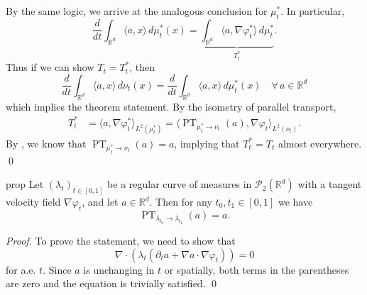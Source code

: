 \documentclass[11pt]{article}
\newcommand{\PT}{\operatorname{PT}}
\begin{document}
By the same logic, we arrive at the analogous conclusion for $\mu_t^*$. In particular, 
\[\frac{d}{dt}\int_{\mathbb{R}^d} \langle a, x\rangle \, d\mu_t^*(x) = \underbrace{\int_{\mathbb{R}^d} \langle a, \nabla \varphi_t^*\rangle \, d\mu_t^*}_{T^*_t}. \]
Thus if we can show $T_t = T^*_t$, then 
\[\frac{d}{dt} \int_{\mathbb{R}^d} \langle a, x\rangle \, d\nu_t(x) = \frac{d}{dt} \int_{\mathbb{R}^d} \langle a, x\rangle \, d\mu_t^*(x) \quad  \forall \, a \in \mathbb{R}^d \]
which implies the theorem statement. By the isometry of parallel transport,
\begin{align*}
    T_t^* &= \langle a, \nabla\varphi_t^* \rangle_{L^2(\mu_t^*)} = \langle {\PT}_{\mu_t^* \rightarrow \nu_t}(a), \nabla\varphi_t\rangle_{L^2(\nu_t)}.
\end{align*}
By , we know that ${\PT}_{\mu_t^* \rightarrow \nu_t}(a) = a$, implying that $T_t^* = T_t$  almost everywhere. \qed{} 

\begin{restatable}{prop}{} \label{affine PT preserves constant fields}
    Let $(\lambda_t)_{t \in [0, 1]}$ be a regular curve of measures in $\mathcal{P}_2(\mathbb{R}^d)$ with a tangent velocity field $\nabla \varphi_t$, and let $a \in \mathbb{R}^d$. Then for any $t_0, t_1 \in [0, 1]$ we have 
    \[{\PT}_{\lambda_{t_0} \rightarrow \lambda_{t_1}}(a) = a.\]
\end{restatable}
\noindent \textit{Proof.} To prove the statement, we need to show that
\[\nabla \cdot (\lambda_t(\partial_ta + \nabla a \cdot \nabla \varphi_t)) = 0\]
for a.e. $t$. Since $a$ is unchanging in $t$ or spatially, both terms in the parentheses are zero and the equation is trivially satisfied. \qed{}

\end{document}

